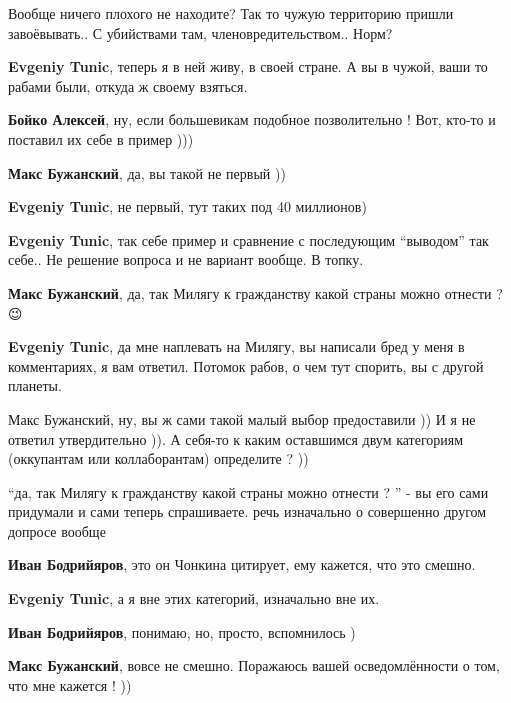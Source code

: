 \begin{itemize}
\begin{itemize}
Вообще ничего плохого не находите?  Так то чужую территорию пришли
завоёвывать.. С убийствами там, членовредительством..  Норм?


\textbf{Evgeniy Tunic}, теперь я в ней живу, в своей стране. А вы в чужой, ваши то рабами были, откуда ж своему взяться.

\textbf{Бойко Алексей}, ну, если большевикам подобное позволительно ! Вот, кто-то и поставил их себе в пример )))

\textbf{Макс Бужанский}, да, вы такой не первый ))

\textbf{Evgeniy Tunic}, не первый, тут таких под 40 миллионов)


\textbf{Evgeniy Tunic}, так себе пример и сравнение с последующим
\enquote{выводом} так себе.. Не решение вопроса и не вариант вообще.  В топку.


\textbf{Макс Бужанский}, да, так Милягу к гражданству какой страны можно отнести ? 😉


\textbf{Evgeniy Tunic}, да мне наплевать на Милягу, вы написали бред у меня в
комментариях, я вам ответил.  Потомок рабов, о чем тут спорить, вы с другой
планеты.


Макс Бужанский, ну, вы ж сами такой малый выбор предоставили )) И я не ответил
утвердительно )). А себя-то к каким оставшимся двум категориям (оккупантам или
коллаборантам) определите ? ))


\enquote{да, так Милягу к гражданству какой страны можно отнести ? } - вы его сами
придумали и сами теперь спрашиваете.  речь изначально о совершенно другом
допросе вообще


\textbf{Иван Бодрийяров}, это он Чонкина цитирует, ему кажется, что это смешно.

\textbf{Evgeniy Tunic}, а я вне этих категорий, изначально вне их.

\textbf{Иван Бодрийяров}, понимаю, но, просто, вспомнилось )

\textbf{Макс Бужанский}, вовсе не смешно. Поражаюсь вашей осведомлённости о том, что мне кажется ! ))


\end{itemize}
\end{itemize}
